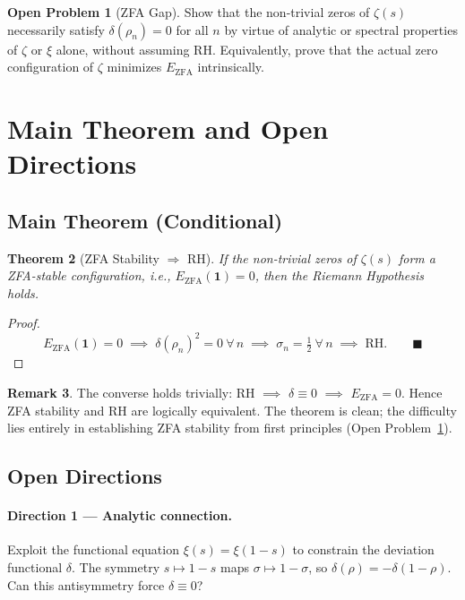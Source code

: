 \documentclass[12pt]{article}
\newtheorem{theorem}{Theorem}[section]
\theoremstyle{definition}
\newtheorem{remark}[theorem]{Remark}
\newtheorem{openproblem}[theorem]{Open Problem}
\newcommand{\EZFA}{E_{\mathrm{ZFA}}}
\begin{document}
\begin{openproblem}[ZFA Gap]\label{op:gap}
Show that the non-trivial zeros of $\zeta(s)$ necessarily satisfy
$\delta(\rho_n) = 0$ for all $n$ by virtue of analytic or
spectral properties of $\zeta$ or $\xi$ alone, without assuming RH.
Equivalently, prove that the actual zero configuration of $\zeta$
minimizes $\EZFA$ intrinsically.
\end{openproblem}

\section{Main Theorem and Open Directions}

\subsection{Main Theorem (Conditional)}

\begin{theorem}[ZFA Stability $\Rightarrow$ RH]
If the non-trivial zeros of $\zeta(s)$ form a ZFA-stable
configuration, i.e., $\EZFA(\mathbf{1}) = 0$, then the Riemann
Hypothesis holds.
\end{theorem}

\begin{proof}
\[
  \EZFA(\mathbf{1}) = 0
  \;\implies\;
  \delta(\rho_n)^2 = 0\ \forall\, n
  \;\implies\;
  \sigma_n = \tfrac{1}{2}\ \forall\, n
  \;\implies\;
  \text{RH.} \qquad\blacksquare
\]
\end{proof}

\begin{remark}
The converse holds trivially: RH $\implies$ $\delta \equiv 0$
$\implies$ $\EZFA = 0$.
Hence ZFA stability and RH are logically equivalent.
The theorem is clean; the difficulty lies entirely in establishing
ZFA stability from first principles (Open Problem~\ref{op:gap}).
\end{remark}

\subsection{Open Directions}

\paragraph{Direction 1 --- Analytic connection.}
Exploit the functional equation $\xi(s) = \xi(1-s)$ to constrain
the deviation functional $\delta$.
The symmetry $s \mapsto 1-s$ maps $\sigma \mapsto 1-\sigma$, so
$\delta(\rho) = -\delta(1-\rho)$.
Can this antisymmetry force $\delta \equiv 0$?
\end{document}

